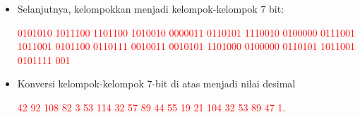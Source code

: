 \documentclass{article}
\begin{document}

\begin{itemize}
    \item Selanjutnya, kelompokkan menjadi kelompok-kelompok 7 bit:
    
    \vspace{5mm}
    \textcolor{red}{0101010 1011100 1101100 1010010 0000011 0110101 1110010}
    \textcolor{red}{0100000 0111001 1011001 0101100 0110111 0010011 0010101}
    \textcolor{red}{1101000 0100000 0110101 1011001 0101111 001}
    
    \vspace{10mm}
    \item Konversi kelompok-kelompok 7-bit di atas menjadi nilai desimal
    
    \vspace{5mm}
    \textcolor{red}{42 92 108 82 3 53 114 32 57 89 44 55 19 21 104 32 53 89 47 1.}
\end{itemize}
\end{document}
